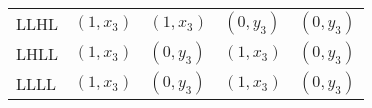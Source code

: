 \begin{tabular}{lrrrr}
LLHL  & \multicolumn{1}{l}{$( 1 , x_3 )$} & \multicolumn{1}{l}{$( 1 , x_3 )$} & \multicolumn{1}{l}{$( 0 , y_3 )$} & \multicolumn{1}{l}{$( 0 , y_3 )$} \\
LHLL  & \multicolumn{1}{l}{$( 1 , x_3 )$} & \multicolumn{1}{l}{$( 0 , y_3 )$} & \multicolumn{1}{l}{$( 1 , x_3 )$} & \multicolumn{1}{l}{$( 0 , y_3 )$} \\
LLLL  & \multicolumn{1}{l}{$( 1 , x_3 )$} & \multicolumn{1}{l}{$( 0 , y_3 )$} & \multicolumn{1}{l}{$( 1 , x_3 )$} & \multicolumn{1}{l}{$( 0 , y_3 )$} \\
\bottomrule
\end{tabular}%

